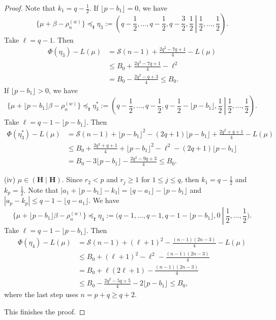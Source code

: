 \documentclass[11pt]{amsart}
\theoremstyle{plain}
\theoremstyle{definition}
\newcommand{\mfk}{\mathfrak{k}}
\newcommand{\caS}{\mathcal{S}}
\begin{document}
\begin{proof}
	Note that $k_1=q-\frac{1}{2}$. If $\lfloor p-b_1\rfloor=0$, we have
	\[\{\mu+\beta-\rho_n^{(w)}\}\preceq_\mfk \eta_3:=\left.\left(q-\frac{1}{2},\dots,q-\frac{1}{2},q-\frac{3}{2},\frac{1}{2}\ \right|\ \frac{1}{2},\dots,\frac{1}{2}\right).\]
	Take $\ell=q-1$. Then
	\begin{align*}
		\Phi(\eta_3)-L(\mu)&=\caS(n-1)+\frac{2q^2-7q+1}{4}-L(\mu)\\
		&\le B_0+\frac{2q^2-7q+1}{4}-\ell^2\\
		&= B_0-\frac{2q^2-q+3}{4}\le B_0.
	\end{align*}
	If $\lfloor p-b_1\rfloor>0$, we have
	\[\{\mu+\lfloor p-b_1\rfloor\beta-\rho_n^{(w)}\}\preceq_\mfk \eta_3^* :=\left.\left(q-\frac{1}{2},\dots,q-\frac{1}{2},q-\frac{1}{2}-\lfloor p-b_1\rfloor,\frac{1}{2}\ \right|\ \frac{1}{2},\dots,\frac{1}{2}\right).\]
	Take $\ell=q-1-\lfloor p-b_1\rfloor$. Then
	\begin{align*}
		\Phi(\eta_3^*)-L(\mu)&=\caS(n-1)+\lfloor p-b_1\rfloor^2-(2q+1)\lfloor p-b_1\rfloor+\frac{2q^2+q+1}{4}-L(\mu)\\
		&\le B_0+\frac{2q^2+q+1}{4}+\lfloor p-b_1\rfloor^2-\ell^2-(2q+1)\lfloor p-b_1\rfloor\\
		&=B_0-3\lfloor p-b_1\rfloor-\frac{2q^2-9q+3}{4}\le B_0.
	\end{align*}
	
	(iv) $\mu\in (\textbf{H}\mid \textbf{H})$. Since $r_2<p$ and $r_j\ge 1$ for $1\le j\le q$, then $k_1=q-\frac{1}{2}$ and $k_p=\frac{1}{2}$. Note that $|a_1+\lfloor p-b_1\rfloor-k_1|=\lfloor q-a_1\rfloor-\lfloor p-b_1\rfloor$ and $|a_p-k_p|\le q-1-\lfloor q-a_1\rfloor$. We have
	\[\{\mu+\lfloor p-b_1\rfloor\beta-\rho_n^{(w)}\}\preceq_\mfk \eta_4 :=\bigg(q-1,\dots,q-1,q-1-\lfloor p-b_1\rfloor,0\ \left|\ \frac{1}{2},\dots,\frac{1}{2}\bigg)\right..\]
	Take $\ell=q-1-\lfloor p-b_1\rfloor$. Then
	\begin{align*}
		\Phi(\eta_4)-L(\mu)&=\caS(n-1)+(\ell+1)^2-\frac{(n-1)(2n-3)}{4}-L(\mu)\\
		&\le B_0+(\ell+1)^2-\ell^2-\frac{(n-1)(2n-3)}{4}\\
		&=B_0+\ell(2\ell+1)-\frac{(n-1)(2n-3)}{4}\\
		&\le B_0-\frac{2q^2-5q+5}{4}-2\lfloor p-b_1\rfloor\le B_0,
		\end{align*}
where the last step uses $n=p+q\ge q+2$.

This finishes the proof.
\end{proof}
\end{document}
